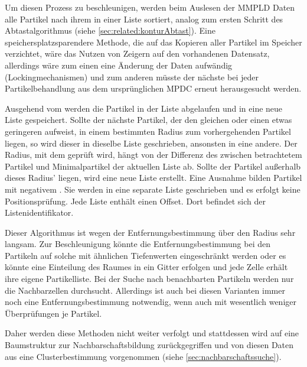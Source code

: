 Um diesen Prozess zu beschleunigen, werden beim Auslesen der MMPLD Daten alle Partikel nach ihrem  in einer Liste sortiert, analog zum ersten Schritt des Abtastalgorithmus (siehe \autoref{sec:related:konturAbtast}). Eine speichersplatzsparendere Methode, die auf das Kopieren aller Partikel im Speicher verzichtet, wäre das Nutzen von Zeigern auf den vorhandenen Datensatz, allerdings wäre zum einen eine Änderung der Daten aufwändig (Lockingmechanismen) und zum anderen müsste der nächste  bei jeder Partikelbehandlung aus dem ursprünglichen MPDC erneut herausgesucht werden.

Ausgehend vom  werden die Partikel in der Liste abgelaufen und in eine neue Liste gespeichert. Sollte der nächste Partikel, der den gleichen oder einen etwas geringeren  aufweist, in einem bestimmten Radius zum vorhergehenden Partikel liegen, so wird dieser in dieselbe Liste geschrieben, ansonsten in eine andere. Der Radius, mit dem geprüft wird, hängt von der Differenz des  zwischen betrachtetem Partikel und Minimalpartikel der aktuellen Liste ab. Sollte der Partikel außerhalb dieses Radius' liegen, wird eine neue Liste erstellt. Eine Ausnahme bilden Partikel mit negativem . Sie werden in eine separate Liste geschrieben und es erfolgt keine Positionsprüfung. Jede Liste enthält einen Offset. Dort befindet sich der Listenidentifikator.

Dieser Algorithmus ist wegen der Entfernungsbestimmung über den Radius sehr langsam. Zur Beschleunigung könnte die Entfernungsbestimmung bei den Partikeln auf solche mit ähnlichen Tiefenwerten eingeschränkt werden %
oder es könnte eine Einteilung des Raumes in ein Gitter erfolgen und jede Zelle erhält ihre eigene Partikelliste. Bei der Suche nach benachbarten Partikeln werden nur die Nachbarzellen durchsucht. Allerdings ist auch bei diesen Varianten immer noch eine Entfernungsbestimmung notwendig, wenn auch mit wesentlich weniger Überprüfungen je Partikel.

Daher werden diese Methoden nicht weiter verfolgt und stattdessen wird auf eine Baumstruktur zur Nachbarschaftsbildung zurückgegriffen und von diesen Daten aus eine Clusterbestimmung vorgenommen (siehe \autoref{sec:nachbarschaftssuche}).


\printbibliography[heading=bibintoc]\label{sec:bibliography}

\printindex %

